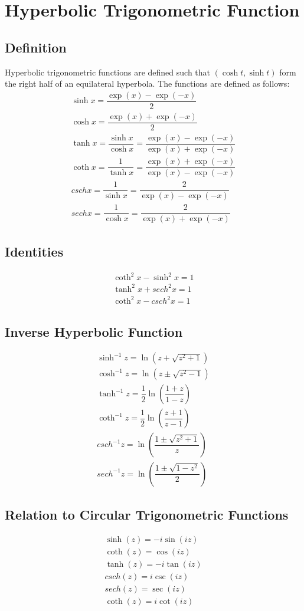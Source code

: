 \chapter{Hyperbolic Trigonometric Function}
\section{Definition}
Hyperbolic trigonometric functions are defined such that $(\cosh t,\sinh t)$ form the right half of an equilateral hyperbola. The functions are defined as follows:
\begin{align}
	\sinh x=\dfrac{\exp(x)-\exp(-x)}{2}\\
	\cosh x=\dfrac{\exp(x)+\exp(-x)}{2}\\
	\tanh x=\dfrac{\sinh x}{\cosh x}=\dfrac{\exp(x)-\exp(-x)}{\exp(x)+\exp(-x)}\\
	\coth x=\dfrac{1}{\tanh x}=\dfrac{\exp(x)+\exp(-x)}{\exp(x)-\exp(-x)}\\
	csch x=\dfrac{1}{\sinh x}=\dfrac{2}{\exp(x)-\exp(-x)}\\
	sech x=\dfrac{1}{\cosh x}=\dfrac{2}{\exp(x)+\exp(-x)}
\end{align}


\section{Identities}
\begin{align}
	\coth^2 x-\sinh^2 x=1\\
	\tanh^2 x+sech^2 x=1\\
	\coth^2 x-csch^2 x=1
\end{align}


\section{Inverse Hyperbolic Function}
\begin{align}
	\sinh^{-1} z= \ln(z+\sqrt{z^2+1})\\
	\cosh^{-1} z= \ln(z\pm\sqrt{z^2-1})\\
	\tanh^{-1} z= \dfrac{1}{2}\ln\left(\dfrac{1+z}{1-z}\right)\\
	\coth^{-1} z= \dfrac{1}{2}\ln\left(\dfrac{z+1}{z-1}\right)\\
	csch^{-1} z= \ln\left(\dfrac{1\pm\sqrt{z^2+1}}{z}\right)\\
	sech^{-1} z= \ln\left(\dfrac{1\pm\sqrt{1-z^2}}{2}\right)
\end{align}


\section{Relation to Circular Trigonometric Functions}
\begin{align}
	\sinh (z)=-i\sin (iz)\\
	\coth (z)= \cos (iz)\\
	\tanh (z)=-i \tan (iz)\\
	csch (z)=i\csc (iz)\\
	sech (z)=\sec (iz)\\
	\coth (z)=i\cot (iz)
\end{align}
